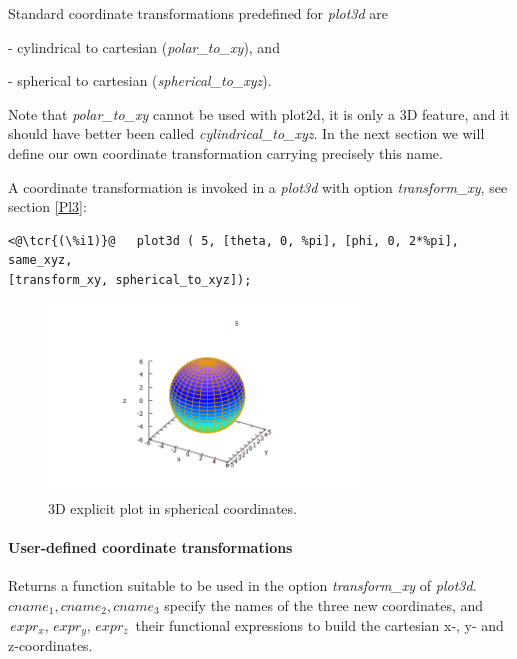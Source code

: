 \documentclass[../Maxima_Workbook.tex]{subfiles}
\begin{document}
\lz Standard coordinate transformations predefined for \emph{plot3d} are 

- cylindrical to cartesian (\emph{polar\_to\_xy}), and

- spherical to cartesian (\emph{spherical\_to\_xyz}).

\lz Note that \emph{polar\_to\_xy} cannot be used with plot2d, it is only a 3D feature, and it should have better been called \emph{cylindrical\_to\_xyz}. In the next section we will define our own coordinate transformation carrying precisely this name.

\lz A coordinate transformation is invoked in a \emph{plot3d} with option \emph{transform\_xy}, see section \ref{Pl3}:

\lz \begin{lstlisting}
<@\tcr{(\%i1)}@   plot3d ( 5, [theta, 0, %pi], [phi, 0, 2*%pi], same_xyz,
[transform_xy, spherical_to_xyz]);
\end{lstlisting}
\vspace{-2mm} 

\begin{figure}
	\centering
	\includegraphics[width=0.75\textwidth]{Pl_explicit_plot3d_spherical.png}
	\caption{3D explicit plot in spherical coordinates.}
	\label{Pl-Fig9}
\end{figure}

\paragraph{User-defined coordinate transformations} \mbox{}

\lz {} \hfill \tcr{[function]}

\lz Returns a function suitable to be used in the option \emph{transform\_xy} of \emph{plot3d}. \\
$ cname_1, cname_2, cname_3 $ specify the names of the three new coordinates, and $ \, expr_x, \, expr_y, \, expr_z \, $ their functional expressions to build the cartesian x-, y- and z-coordinates.
\end{document}
